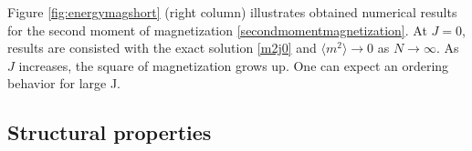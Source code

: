   Figure \ref{fig:energymagshort} (right column) illustrates obtained numerical results for the second moment of magnetization \eqref{secondmomentmagnetization}. At $J=0$, results are consisted with the exact solution \eqref{m2j0} and $  \langle m^2 \rangle  \rightarrow 0$ as $N \rightarrow \infty$. As $J$ increases, the square of magnetization grows up. One can expect an ordering behavior for large J.
  
 
 
\subsection{Structural properties}

